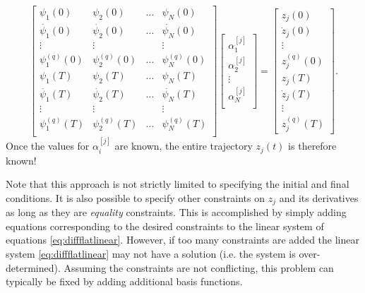 \begin{equation} \label{eq:diffflatlinear}
\begin{bmatrix}
    \psi_1(0) & \psi_2(0) & \dots & \psi_N(0) \\
    \dot{\psi_1}(0) & \dot{\psi_2}(0) & \dots & \dot{\psi_N}(0) \\
    \vdots & \vdots & & \vdots \\
    \psi_1^{(q)}(0) & \psi_2^{(q)}(0) & \dots & \psi_N^{(q)}(0) \\
    \psi_1(T) & \psi_2(T) & \dots & \psi_N(T) \\
    \dot{\psi_1}(T) & \dot{\psi_2}(T) & \dots & \dot{\psi_N}(T) \\
    \vdots & \vdots & & \vdots \\
    \psi_1^{(q)}(T) & \psi_2^{(q)}(T) & \dots & \psi_N^{(q)}(T) \\
\end{bmatrix}
\begin{bmatrix}
    \alpha_1^{[j]} \\
    \alpha_2^{[j]} \\
    \vdots \\
    \alpha_N^{[j]} \\
\end{bmatrix} =
\begin{bmatrix}
    z_j(0) \\
    \dot{z}_j(0) \\
    \vdots \\
    z^{(q)}_j(0) \\
    z_j(T) \\
    \dot{z}_j(T) \\
    \vdots \\
    z_j^{(q)}(T)
\end{bmatrix}.
\end{equation}
Once the values for $\alpha_i^{[j]}$ are known, the entire trajectory $z_j(t)$ is therefore known!

Note that this approach is not strictly limited to specifying the initial and final conditions. It is also possible to specify other constraints on $z_j$ and its derivatives as long as they are \textit{equality} constraints. This is accomplished by simply adding equations corresponding to the desired constraints to the linear system of equations \eqref{eq:diffflatlinear}. However, if too many constraints are added the linear system \eqref{eq:diffflatlinear} may not have a solution (i.e. the system is over-determined). Assuming the constraints are not conflicting, this problem can typically be fixed by adding additional basis functions.

